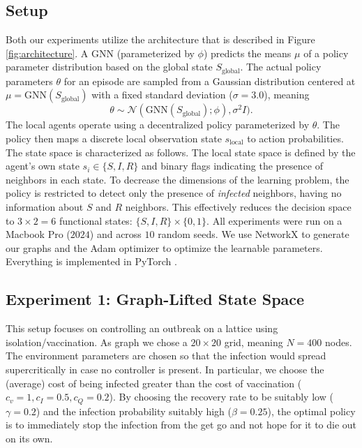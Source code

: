 \documentclass{article}
\begin{document}
\subsection{Setup}
Both our experiments utilize the architecture that is described in Figure \ref{fig:architecture}. A GNN (parameterized by $\phi$) predicts the means $\mu$ of a policy parameter distribution based on the global state $S_{\mathrm{global}}$. The actual policy parameters $\theta$ for an episode are sampled from a Gaussian distribution centered at $\mu = \mathrm{GNN}(S_{\mathrm{global}})$ with a fixed standard deviation ($\sigma=3.0$), meaning
\[ \theta \sim \mathcal{N}(\mathrm{GNN}(S_{\mathrm{global}}); \phi), \sigma^2 I). \]
The local agents operate using a decentralized policy parameterized by $\theta$. The policy then maps a discrete local observation state $s_{\mathrm{local}}$ to action probabilities. The state space is characterized as follows.
The local state space is defined by the agent's own state $s_i \in \{S, I, R\}$ and binary flags indicating the presence of neighbors in each state. To decrease the dimensions of the learning problem, the policy is restricted to detect only the presence of \textit{infected} neighbors, having no information about $S$ and $R$ neighbors. This effectively reduces the decision space to $3 \times 2 = 6$ functional states: $\{S, I, R\} \times \{0,1\}$. All experiments were run on a Macbook Pro ($2024$) and across $10$ random seeds. We use NetworkX \cite{hagberg2008networkx} to generate our graphs and the Adam optimizer \cite{kingma2014adam} to optimize the learnable parameters. Everything is implemented in PyTorch \cite{paszke2019pytorch}.

\subsection*{Experiment 1: Graph-Lifted State Space}
\noindent This setup focuses on controlling an outbreak on a lattice using isolation/vaccination. 
As graph we chose a $20 \times 20$ grid, meaning $N=400$ nodes.
The environment parameters are chosen so that the infection would spread supercritically in case no controller is present. In particular, we choose the (average) cost of being infected greater than the cost of vaccination ($c_v = 1, c_I = 0.5, c_Q = 0.2$). By choosing the recovery rate to be suitably low ($\gamma=0.2$) and the infection probability suitably high ($\beta = 0.25$), the optimal policy is to immediately stop the infection from the get go and not hope for it to die out on its own. 
\end{document}
